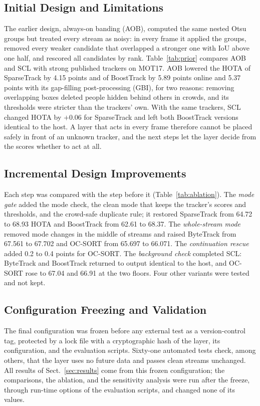 \documentclass[pdflatex,sn-mathphys-num,iicol]{sn-jnl}
\newcommand{\scl}{SCL}
\newcommand{\aob}{AOB}
\begin{document}
\subsection{Initial Design and Limitations}\label{sec:prior}
The earlier design, always-on banding (\aob{}), computed the same nested Otsu groups but treated every stream as noisy:
in every frame it applied the groups, removed every weaker candidate that overlapped a stronger one
with IoU above one half, and rescored all candidates by rank. Table~\ref{tab:prior} compares \aob{}
and \scl{} with strong published trackers on MOT17. \aob{} lowered the HOTA of SparseTrack by 4.15
points and of BoostTrack by 5.89 points online and 5.37 points with its gap-filling post-processing
(GBI), for two reasons: removing overlapping boxes deleted people hidden behind others in crowds,
and its thresholds were stricter than the trackers' own. With the same trackers, \scl{} changed
HOTA by $+0.06$ for SparseTrack and left both BoostTrack versions identical to the host. A layer
that acts in every frame therefore cannot be placed safely in front of an unknown tracker, and the
next steps let the layer decide from the scores whether to act at all.


\subsection{Incremental Design Improvements}\label{sec:steps}
Each step was compared with the step before it (Table~\ref{tab:ablation}). The \emph{mode gate}
added the mode check, the clean mode that keeps the tracker's scores and thresholds, and the crowd-safe duplicate
rule; it restored SparseTrack from 64.72 to 68.93 HOTA and BoostTrack from 62.61 to 68.37. The
\emph{whole-stream mode} removed mode changes in the middle of streams and raised ByteTrack from
67.561 to 67.702 and OC-SORT from 65.697 to 66.071. The \emph{continuation rescue} added 0.2 to 0.4
points for OC-SORT. The \emph{background check} completed \scl{}: ByteTrack and BoostTrack returned
to output identical to the host, and OC-SORT rose to 67.04 and 66.91 at the two floors. Four other
variants were tested and not kept.


\subsection{Configuration Freezing and Validation}\label{sec:freeze}
The final configuration was frozen before any external test as a version-control tag, protected
by a lock file with a cryptographic hash of the layer, its configuration, and the evaluation
scripts. Sixty-one automated tests check, among others, that the layer uses no future data and
passes clean streams unchanged. All results of Sect.~\ref{sec:results} come from this frozen
configuration; the comparisons, the ablation, and the sensitivity analysis were run after the
freeze, through run-time options of the evaluation scripts, and changed none of its values.
\end{document}

